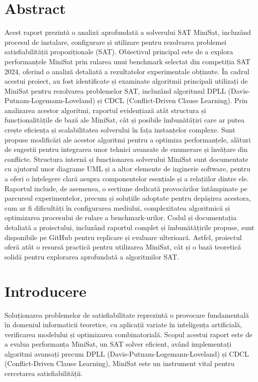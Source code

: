 \documentclass[12pt,a4paper]{report}
\begin{document}
\chapter*{Abstract}
Acest raport prezintă o analiză aprofundată a solverului SAT MiniSat, incluzând procesul de instalare, configurare și utilizare pentru rezolvarea problemei satisfiabilității propoziționale (SAT). Obiectivul principal este de a explora performanțele MiniSat prin rularea unui benchmark selectat din competiția SAT 2024, oferind o analiză detaliată a rezultatelor experimentale obținute. În cadrul acestui proiect, au fost identificate și examinate algoritmii principali utilizați de MiniSat pentru rezolvarea problemelor SAT, incluzând algoritmul DPLL (Davis-Putnam-Logemann-Loveland) și CDCL (Conflict-Driven Clause Learning).
Prin analizarea acestor algoritmi, raportul evidențiază atât structura și funcționalitățile de bază ale MiniSat, cât și posibile îmbunătățiri care ar putea crește eficiența și scalabilitatea solverului în fața instanțelor complexe. Sunt propuse modificări ale acestor algoritmi pentru a optimiza performanțele, alături de sugestii pentru integrarea unor tehnici avansate de enumerare și învățare din conflicte. Structura internă și funcționarea solverului MiniSat sunt documentate cu ajutorul unor diagrame UML și a altor elemente de inginerie software, pentru a oferi o înțelegere clară asupra componentelor esențiale și a relațiilor dintre ele.
Raportul include, de asemenea, o secțiune dedicată provocărilor întâmpinate pe parcursul experimentelor, precum și soluțiile adoptate pentru depășirea acestora, cum ar fi dificultăți în configurarea mediului, complexitatea algoritmică și optimizarea procesului de rulare a benchmark-urilor. Codul și documentația detaliată a proiectului, incluzând raportul complet și îmbunătățirile propuse, sunt disponibile pe GitHub pentru replicare și evaluare ulterioară. Astfel, proiectul oferă atât o resursă practică pentru utilizarea MiniSat, cât și o bază teoretică solidă pentru explorarea aprofundată a algoritmilor SAT.




\tableofcontents

\chapter{Introducere}
Soluționarea problemelor de satisfiabilitate reprezintă o provocare fundamentală în domeniul informaticii teoretice, cu aplicații variate în inteligența artificială, verificarea modelului și optimizarea combinatorială. Scopul acestui raport este de a evalua performanța MiniSat, un SAT solver eficient, având implementați algoritmi avansați precum DPLL (Davis-Putnam-Logemann-Loveland) și CDCL (Conflict-Driven Clause Learning), MiniSat este un instrument vital pentru cercetarea satisfiabilității.\cite{b5}
\end{document}
